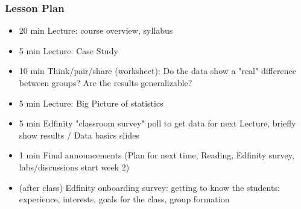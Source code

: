 \begin{frame}
    \frametitle{Lesson Plan}
    \begin{itemize}
        \item 20 min Lecture: course overview, syllabus
        \item 5 min Lecture: Case Study
        \item 10 min Think/pair/share (worksheet): Do the data show a "real" difference between groups? Are the results generalizable?
        \item 5 min Lecture: Big Picture of statistics
        \item 5 min Edfinity "classroom survey" poll to get data for next Lecture, briefly show results / Data basics slides
        \item 1 min Final announcements (Plan for next time, Reading, Edfinity survey, labs/discussions start week 2)
        \item (after class) Edfinity onboarding survey: getting to know the students: experience, interests, goals for the class, group formation
    \end{itemize}
\end{frame}
    


